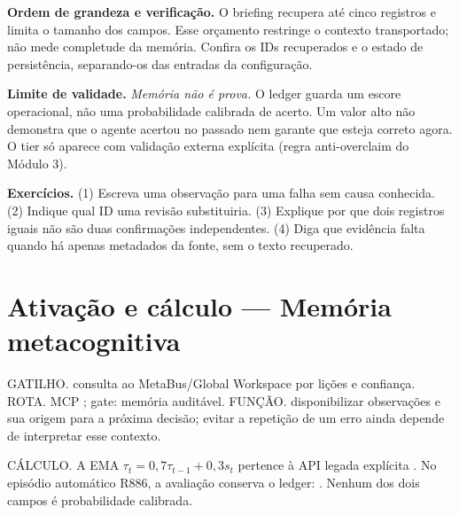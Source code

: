 \begin{resultado}
\textbf{Ordem de grandeza e verificação.} O briefing recupera até cinco registros
e limita o tamanho dos campos. Esse orçamento restringe o contexto transportado;
não mede completude da memória. Confira os IDs recuperados e o estado de
persistência, separando-os das \CoreAgentCount{} entradas da configuração.
\end{resultado}

\begin{aviso}
\textbf{Limite de validade.} \emph{Memória não é prova.} O ledger guarda um escore
operacional, não uma probabilidade calibrada de acerto. Um valor alto não demonstra
que o agente acertou no passado nem garante que esteja correto agora. O tier  só
aparece com validação externa explícita (regra anti-overclaim do Módulo 3).
\end{aviso}

\begin{resultado}
\textbf{Exercícios.} (1) Escreva uma observação para uma falha sem causa conhecida.
(2) Indique qual ID uma revisão substituiria. (3) Explique por que dois registros
iguais não são duas confirmações independentes. (4) Diga que evidência falta
quando há apenas metadados da fonte, sem o texto recuperado.
\end{resultado}

\section[Ativação e cálculo]{Ativação e cálculo — Memória metacognitiva}

\begin{processo}
GATILHO. consulta ao MetaBus/Global Workspace por lições e confiança.
ROTA. MCP ; gate: memória auditável.
FUNÇÃO. disponibilizar observações e sua origem para a próxima decisão;
evitar a repetição de um erro ainda depende de interpretar esse contexto.
\end{processo}

\begin{resultado}
CÁLCULO. A EMA $\tau_t=0{,}7\tau_{t-1}+0{,}3s_t$ pertence à API legada explícita
. No episódio automático R886, a avaliação conserva o ledger:
. Nenhum dos dois campos é probabilidade calibrada.
\end{resultado}

